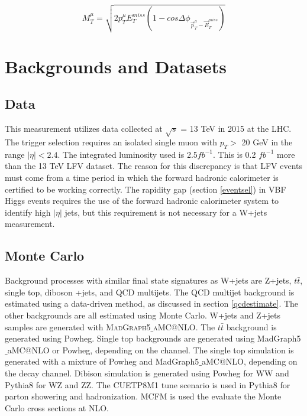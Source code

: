 \documentclass[oneside, letterpaper, oldfontcommands]{memoir}
\begin{document}
\begin{equation}
M_{T}^{\mu} = \sqrt{2 p_{T}^{\mu}E_{T}^{miss}(1-cos \Delta\phi_{\vec{p}_{T}^{\mu}-\vec{E}_{T}^{miss}})}
\label{eq:mumu}
\end{equation}

\section{Backgrounds and Datasets}
\subsection{Data}
\qquad This measurement utilizes data collected at $\sqrt{s}$ = 13 TeV in 2015 at the LHC. The trigger selection requires an isolated single muon with $p_{T} >$ 20 GeV in the range $|\eta| < 2.4$. The integrated luminosity used is 2.5$fb^{-1}$. This is 0.2 $fb^{-1}$ more than the 13 TeV LFV dataset. The reason for this discrepancy is that LFV events must come from a time period in which the forward hadronic calorimeter is certified to be working correctly. The rapidity gap (section \ref{eventsel}) in VBF Higgs events requires the use of the forward hadronic calorimeter system to identify high $|\eta|$ jets, but this requirement is not necessary for a W+jets measurement.

\subsection{Monte Carlo}\label{wjetsmc}
\qquad Background processes with similar final state signatures as W+jets are Z+jets, $t\bar{t}$, single top, diboson +jets, and QCD multijets. The QCD multijet background is estimated using a data-driven method, as discussed in section \ref{qcdestimate}. The other backgrounds are all estimated using Monte Carlo. W+jets and Z+jets samples are generated with \textsc{{\sc MadGraph5$\_$aMC@NLO}}\cite{Alwall:2014hca}. 
The $t\bar{t}$ background is generated using {\sc Powheg}. Single top backgrounds are generated using {\sc MadGraph5$\_$aMC@NLO} or {\sc Powheg}\cite{Frixione:2007nu}, depending on the channel. 
The single top simulation is generated with a mixture of {\sc Powheg} and {\sc MadGraph5$\_$aMC@NLO}, depending on the decay channel. Dibison simulation is generated using {\sc Powheg} for WW and {\sc Pythia}8 for WZ and ZZ. The CUETP8M1\cite{Khachatryan:2015pea} tune scenario is used in {\sc Pythia}8 for parton showering and hadronization. MCFM \cite{Campbell:2015qma}\cite{Campbell:2011bn}\cite{Campbell:1999ah} is used the evaluate the Monte Carlo cross sections at NLO. 
\end{document}
